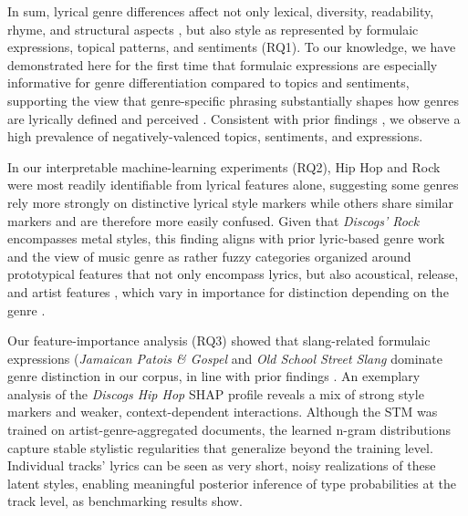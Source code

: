 \documentclass{article}
\begin{document}
In sum, lyrical genre differences affect not only lexical, diversity, readability, rhyme, and structural aspects \cite{paradacabaleiroSongLyricsHave2024,mayerlComparingLyricsFeatures2020,schedlGenreDifferencesSong2019,fell2014lyrics}, but also style as represented by formulaic expressions, topical patterns, and sentiments (RQ1). To our knowledge, we have demonstrated here for the first time that formulaic expressions are especially informative for genre differentiation compared to topics and sentiments, supporting the view that genre-specific phrasing substantially shapes how genres are lyrically defined and perceived \cite{frithWhySongsHave1986}. Consistent with prior findings \cite{brandCulturalEvolutionEmotional2019,napierQuantitativeSentimentAnalysis2018}, we observe a high prevalence of negatively-valenced topics, sentiments, and expressions.


In our interpretable machine-learning experiments (RQ2), Hip Hop and Rock were most readily identifiable from lyrical features alone, suggesting some genres rely more strongly on distinctive lyrical style markers while others share similar markers and are therefore more easily confused. Given that \textit{Discogs' Rock} encompasses metal styles, this finding aligns with prior lyric-based genre work \cite{tsaptsinosLyricsBasedMusicGenre2017, fell2014lyrics} and the view of music genre as rather fuzzy categories organized around prototypical features that not only encompass lyrics, but also acoustical, release, and artist features \cite{fabbriTheoryMusicalGenres1982}, which vary in importance for distinction depending on the genre \cite{fell2014lyrics}. 

Our feature-importance analysis (RQ3) showed that slang-related formulaic expressions (\textit{Jamaican Patois \& Gospel} and \textit{Old School Street Slang} dominate genre distinction in our corpus, in line with prior findings \cite{fell2014lyrics}. An exemplary analysis of the \textit{Discogs Hip Hop} SHAP profile reveals a mix of strong style markers and weaker, context-dependent interactions. Although the STM was trained on artist-genre-aggregated documents, the learned n-gram distributions capture stable stylistic regularities that generalize beyond the training level. Individual tracks' lyrics can be seen as very short, noisy realizations of these latent styles, enabling meaningful posterior inference of type probabilities at the track level, as benchmarking results show.
\end{document}
